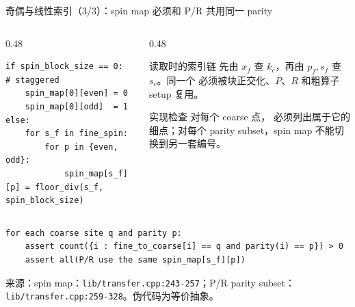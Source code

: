 \documentclass[UTF8,aspectratio=169,11pt]{ctexbeamer}
\newcommand{\source}[1]{\vspace{0.05em}\par{\raggedright\scriptsize\color{muted}来源：#1\par}}
\newcommand{\codepath}[1]{\nolinkurl{#1}}
\begin{document}
\begin{frame}[fragile,t]{奇偶与线性索引（3/3）：spin map 必须和 P/R 共用同一 parity}
  \begin{columns}[T,totalwidth=\textwidth]
    \begin{column}{0.48\textwidth}
\begin{lstlisting}[firstnumber=1]
if spin_block_size == 0:            # staggered
    spin_map[0][even] = 0
    spin_map[0][odd]  = 1
else:
    for s_f in fine_spin:
        for p in {even, odd}:
            spin_map[s_f][p] = floor_div(s_f, spin_block_size)
\end{lstlisting}
    \end{column}
    \begin{column}{0.48\textwidth}
      \begin{block}{读取时的索引链}
        先由 \(x_f\) 查 \(k_c\)，再由 \(p_f,s_f\) 查 \(s_c\)。同一个 \texttt{} 必须被块正交化、\(P\)、\(R\) 和粗算子 setup 复用。
      \end{block}
      \begin{alertblock}{实现检查}
        对每个 coarse 点，\texttt{} 必须列出属于它的细点；对每个 parity subset，spin map 不能切换到另一套编号。
      \end{alertblock}
    \end{column}
  \end{columns}
  \vspace{0.08cm}
  \begin{lstlisting}[firstnumber=1]
for each coarse site q and parity p:
    assert count({i : fine_to_coarse[i] == q and parity(i) == p}) > 0
    assert all(P/R use the same spin_map[s_f][p])
  \end{lstlisting}
  \source{spin map：\codepath{lib/transfer.cpp:243-257}；P/R parity subset：\codepath{lib/transfer.cpp:259-328}。伪代码为等价抽象。}
\end{frame}
\end{document}
